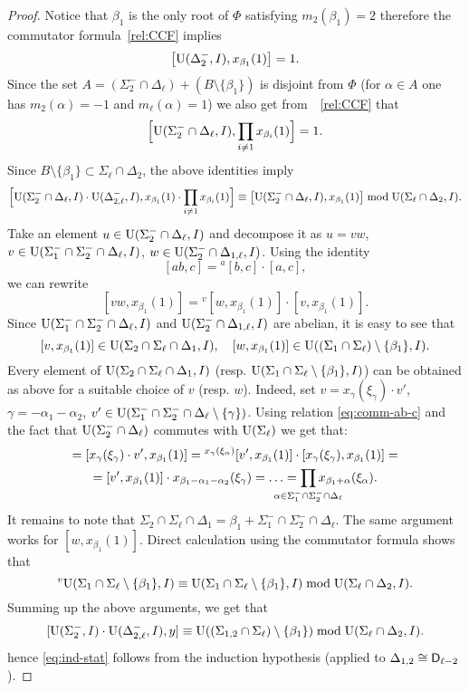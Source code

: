 \begin{proof}
Notice that $\beta_1$ is the only root of $\Phi$ satisfying $m_2(\beta_1)=2$ therefore the commutator formula~\eqref{rel:CCF} implies
\[ \bigl[\operatorname{U}(\Delta_2^-, I),x_{\beta_1}(1)\bigr]=1. \]
Since the set $A=(\Sigma_2^-\cap\Delta_\ell)+(B\setminus\{\beta_1\})$ is disjoint from $\Phi$ 
(for $\alpha\in A$ one has $m_2(\alpha)=-1$ and $m_\ell(\alpha)=1$)
we also get from~~\eqref{rel:CCF} that
\[\Bigl[\operatorname{U}(\Sigma_2^-\cap\Delta_\ell, I),\prod_{i\neq1}x_{\beta_i}(1)\Bigr]=1. \]
Since $B\setminus\{\beta_1\}\subset\Sigma_\ell\cap\Delta_2$, the above identities imply
\[ \Bigl[ \operatorname{U}(\Sigma_2^-\cap\Delta_\ell, I)\cdot\operatorname{U}(\Delta_{2,\ell}^-, I), x_{\beta_1}(1)\cdot\prod_{i\neq1}x_{\beta_i}(1) \Bigr] \equiv \bigl[ \operatorname{U}(\Sigma_2^-\cap\Delta_\ell, I), x_{\beta_1}(1) \bigr] \bmod \operatorname{U}(\Sigma_\ell\cap\Delta_2, I). \]
Take an element $u\in\operatorname{U}(\Sigma_2^-\cap\Delta_\ell, I)$ and decompose it as $u=vw$, $v\in\operatorname{U}(\Sigma_1^-\cap\Sigma_2^-\cap\Delta_\ell, I)$, $w\in\operatorname{U}(\Sigma_2^-\cap\Delta_{1,\ell}, I)$.
Using the identity
\begin{equation}\label{eq:comm-ab-c}
[ab,c]={}^a[b,c]\cdot[a,c],
\end{equation}
we can rewrite
\[ [vw,x_{\beta_1}(1)] = {}^v[w,x_{\beta_1}(1)]\cdot[v,x_{\beta_1}(1)].  \]
Since $\operatorname{U}(\Sigma_1^-\cap\Sigma_2^-\cap\Delta_\ell, I)$ and $\operatorname{U}(\Sigma_2^-\cap\Delta_{1,\ell}, I)$ are abelian, it is easy to see that
\[ [v,x_{\beta_1}(1)]\in\operatorname{U}(\Sigma_2\cap\Sigma_\ell\cap\Delta_1, I), \quad [w,x_{\beta_1}(1)]\in\operatorname{U}((\Sigma_1\cap\Sigma_\ell)\setminus\{\beta_1\}, I). \]
Every element of $\operatorname{U}(\Sigma_2\cap\Sigma_\ell\cap\Delta_1, I)$ (resp. $\operatorname{U}(\Sigma_1\cap\Sigma_\ell\setminus\{\beta_1\}, I)$) can be obtained as above for a suitable choice of $v$ (resp. $w$).
Indeed, set $v=x_\gamma(\xi_\gamma)\cdot v'$, $\gamma=-\alpha_1-\alpha_2$, $v' \in \operatorname{U}(\Sigma_1^- \cap \Sigma_2^- \cap \Delta_\ell \setminus \{\gamma\})$.
Using relation \eqref{eq:comm-ab-c} and the fact that $\operatorname{U}(\Sigma_2^-\cap\Delta_\ell)$ commutes with $\operatorname{U}(\Sigma_\ell)$ we get that:
\begin{multline*} [v, x_{\beta_1}(1)] = [x_\gamma(\xi_\gamma)\cdot v', x_{\beta_1}(1)] = {}^{x_\gamma(\xi_\alpha)}[v', x_{\beta_1}(1)] \cdot [x_\gamma(\xi_\gamma), x_{\beta_1}(1)] = \\
 = [v', x_{\beta_1}(1)]\cdot x_{\beta_1-\alpha_1-\alpha_2}(\xi_\gamma) = \ldots = \prod_{\mathclap{\alpha\in\Sigma_1^- \cap \Sigma_2^- \cap \Delta_\ell}} x_{\beta_1+\alpha}(\xi_\alpha). \end{multline*}
It remains to note that $\Sigma_2 \cap \Sigma_\ell \cap \Delta_1 = \beta_1 + \Sigma_1^- \cap \Sigma_2^- \cap \Delta_\ell$. The same argument works for $[w, x_{\beta_1}(1)]$.
Direct calculation using the commutator formula shows that
\[ {}^v\!\operatorname{U}(\Sigma_1\cap\Sigma_\ell\setminus\{\beta_1\}, I) \equiv \operatorname{U}(\Sigma_1\cap\Sigma_\ell\setminus\{\beta_1\}, I) \bmod \operatorname{U}(\Sigma_\ell\cap\Delta_2, I). \]
Summing up the above arguments, we get that
\[ [\operatorname{U}(\Sigma_2^-, I)\cdot\operatorname{U}(\Delta_{2,\ell}^-, I),y] \equiv \operatorname{U}((\Sigma_{1,2}\cap\Sigma_\ell)\setminus\{\beta_1\}) \bmod \operatorname{U}(\Sigma_\ell\cap\Delta_2, I). \]
hence \eqref{eq:ind-stat} follows from the induction hypothesis (applied to $\Delta_{1,2} \cong \mathsf{D}_{\ell-2}$). 


\end{proof}

